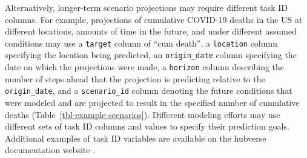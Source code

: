 \documentclass[
  article,
  shortnames,
  notitle]{jss}
\begin{document}
Alternatively, longer-term scenario projections may require different
task ID columns. For example, projections of cumulative COVID-19 deaths
in the US at different locations, amounts of time in the future, and
under different assumed conditions may use a \texttt{target} column of
``cum death'', a \texttt{location} column specifying the location being
predicted, an \texttt{origin\_date} column specifying the date on which
the projections were made, a \texttt{horizon} column describing the
number of steps ahead that the projection is predicting relative to the
\texttt{origin\_date}, and a \texttt{scenario\_id} column denoting the
future conditions that were modeled and are projected to result in the
specified number of cumulative deaths
(Table~\ref{tbl-example-scenarios}). Different modeling efforts may use
different sets of task ID columns and values to specify their prediction
goals. Additional examples of task ID variables are available on the
hubverse documentation website \citep{hubverse_docs}.
\end{document}
